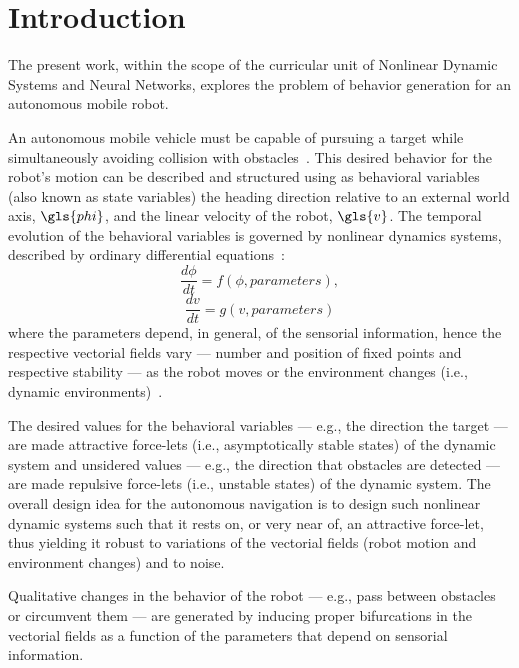%
%
%
\chapter{Introduction}%
\label{ch:introduction}
The present work, within the scope of the curricular unit of Nonlinear Dynamic
Systems and Neural Networks, explores the problem of behavior generation for an
autonomous mobile robot.

An autonomous mobile vehicle must be capable of pursuing a target while
simultaneously avoiding collision with obstacles~\cite{bicho2000dynamic}. This
desired behavior for the robot's motion can be described and structured using
as behavioral variables (also known as state variables) the heading direction
relative to an external world axis, $\gls{phi}$, and the linear velocity of the
robot, $\gls{v}$. The temporal evolution of the behavioral variables is governed by
nonlinear dynamics systems, described by ordinary differential equations~\cite{bicho2000dynamic}:
%
\begin{equation}
  \label{eq:1}
  \frac{d \phi}{dt} = f (\phi{,} parameters),
\end{equation}
%
\begin{equation}
  \label{eq:2}
\frac{dv}{dt} = g (v{,}parameters)
\end{equation}
%
where the parameters depend, in general, of the sensorial information, hence the
respective vectorial fields vary --- number and position of fixed points and
respective stability --- as the robot moves or the environment changes (i.e.,
dynamic environments)~\cite{bicho2000dynamic}.

The desired values for the behavioral variables --- e.g., the direction the
target --- are made attractive force-lets (i.e., asymptotically stable states) of the
dynamic system and unsidered values --- e.g., the direction that obstacles are
detected --- are made repulsive force-lets (i.e., unstable states) of the
dynamic system. The overall design idea for the autonomous navigation is to
design such nonlinear dynamic systems such that it rests on, or very near of, an
attractive force-let, thus yielding it robust to variations of the vectorial
fields (robot motion and environment changes) and to noise.

Qualitative changes in the behavior of the robot --- e.g., pass between
obstacles or circumvent them --- are generated by inducing proper bifurcations
in the vectorial fields as a function of the parameters that depend on sensorial
information.

